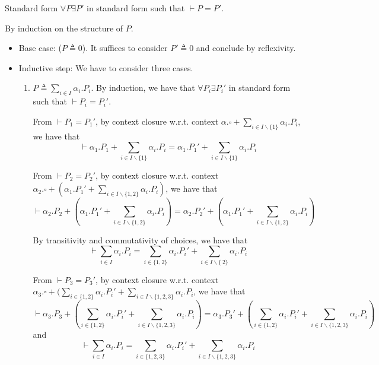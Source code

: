 \begin{Lemma}{Standard form}{}
    $\forall P \exists P'$ in standard form such that $\vdash P = P'$.
    \begin{demonstration}
    By induction on the structure of $P$.
    \begin{itemize}
        \item Base case: ($P \triangleq 0$). It suffices to consider $P'\triangleq 0$ and conclude by reflexivity.
        \item Inductive step: We have to consider three cases.
        \begin{enumerate}
            \item $P \triangleq \sum_{i\in I}\alpha_i.P_i$. By induction, we have that $\forall P_i \exists P_i'$ in standard form such that $\vdash P_i = P_i'$. 
            
            From $\vdash P_1 = P_1'$, by context closure w.r.t. context $\alpha.\square+\sum_{i\in I\backslash\{1\}}\alpha_i.P_i$, we have that
            \begin{equation*}
                \vdash \alpha_1.P_1 + \sum_{i\in I\backslash\{1\}}\alpha_i.P_i = \alpha_1.P_1' + \sum_{i\in I\backslash\{1\}}\alpha_i.P_i
            \end{equation*}
            
            From $\vdash P_2 = P_2'$, by context closure w.r.t. context $\alpha_2.\square+(\alpha_1.P_1'+\sum_{i\in I\backslash\{1, 2\}}\alpha_i.P_i)$, we have that
            \begin{equation*}
                \vdash \alpha_2.P_2 + (\alpha_1.P_1' + \sum_{i\in I\backslash\{1, 2\}}\alpha_i.P_i) = \alpha_2.P_2' + (\alpha_1.P_1' + \sum_{i\in I\backslash\{1, 2\}}\alpha_i.P_i)
            \end{equation*}
            
            By transitivity and commutativity of choices, we have that
            \begin{equation*}
                \vdash \sum_{i\in I}\alpha_i.P_i = \sum_{i\in \{1, 2\}}\alpha_i.P_i' + \sum_{i\in I\backslash\{\, 2\}}\alpha_i.P_i
            \end{equation*}

            From $\vdash P_3 = P_3'$, by context closure w.r.t. context $\alpha_3.\square+(\sum_{i\in\{1, 2\}}\alpha_i.P_i'+\sum_{i\in I\backslash\{1, 2, 3\}}\alpha_i.P_i$, we have that
            \begin{equation*}
                \vdash \alpha_3.P_3 + (\sum_{i\in \{1, 2\}}\alpha_i.P_i' + \sum_{i\in I\backslash\{1, 2, 3\}}\alpha_i.P_i) = 
                \alpha_3.P_3'+(\sum_{i\in \{1, 2\}}\alpha_i.P_i'+\sum_{i\in I\backslash\{1, 2, 3\}}\alpha_i.P_i)
            \end{equation*}
            and
            \begin{equation*}
                \vdash \sum_{i\in I}\alpha_i.P_i = \sum_{i \in \{1, 2, 3\}}\alpha_i.P_i' + \sum_{i \in I\backslash\{1, 2, 3\}}\alpha_i.P_i
            \end{equation*}


\end{enumerate}
\end{itemize}
\end{demonstration}
\end{Lemma}
